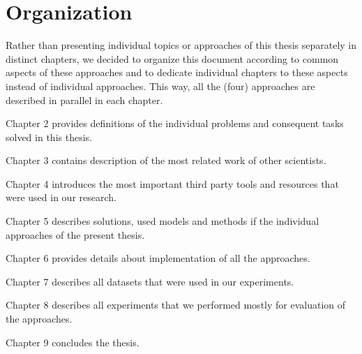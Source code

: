 \section{Organization}

Rather than presenting individual topics or approaches of this thesis separately in distinct chapters, we decided to organize this document according to common aspects of these approaches and to dedicate individual chapters to these aspects instead of individual approaches. This way, all the (four) approaches are described in parallel in each chapter. 

Chapter 2 provides definitions of the individual problems and consequent tasks solved in this thesis.

Chapter 3 contains description of the most related work of other scientists.

Chapter 4 introduces the most important third party tools and resources that were used in our research.

Chapter 5 describes solutions, used models and methods if the individual approaches of the present thesis.

Chapter 6 provides details about implementation of all the approaches.

Chapter 7 describes all datasets that were used in our experiments.

Chapter 8 describes all experiments that we performed mostly for evaluation of the approaches.

Chapter 9 concludes the thesis.

